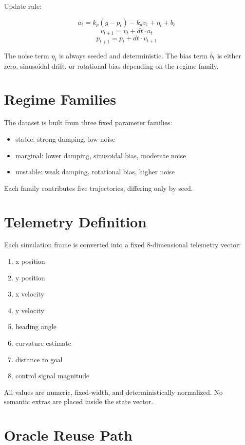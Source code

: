 \documentclass[11pt]{article}
\begin{document}
Update rule:

\[
a_t = k_p (g - p_t) - k_d v_t + \eta_t + b_t
\]
\[
v_{t+1} = v_t + dt \cdot a_t
\]
\[
p_{t+1} = p_t + dt \cdot v_{t+1}
\]

The noise term $\eta_t$ is always seeded and deterministic.
The bias term $b_t$ is either zero, sinusoidal drift, or rotational bias depending on the regime family.

\section{Regime Families}

The dataset is built from three fixed parameter families:

\begin{itemize}
\item stable: strong damping, low noise
\item marginal: lower damping, sinusoidal bias, moderate noise
\item unstable: weak damping, rotational bias, higher noise
\end{itemize}

Each family contributes five trajectories, differing only by seed.

\section{Telemetry Definition}

Each simulation frame is converted into a fixed 8-dimensional telemetry vector:

\begin{enumerate}
\item x position
\item y position
\item x velocity
\item y velocity
\item heading angle
\item curvature estimate
\item distance to goal
\item control signal magnitude
\end{enumerate}

All values are numeric, fixed-width, and deterministically normalized.
No semantic extras are placed inside the state vector.

\section{Oracle Reuse Path}
\end{document}
